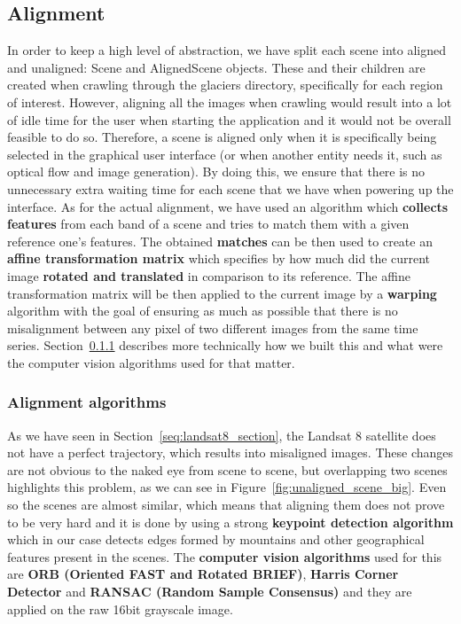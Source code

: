 \documentclass[11pt, a4paper]{report}
\begin{document}
	
	\subsection{Alignment}
	\label{seq:alignment_implementation}
	
	In order to keep a high level of abstraction, we have split each scene into aligned and unaligned: Scene and AlignedScene objects. These and their children are created when crawling through the glaciers directory, specifically for each region of interest. However, aligning all the images when crawling would result into a lot of idle time for the user when starting the application and it would not be overall feasible to do so. Therefore, a scene is aligned only when it is specifically being selected in the graphical user interface (or when another entity needs it, such as optical flow and image generation). By doing this, we ensure that there is no unnecessary extra waiting time for each scene that we have when powering up the interface.
	As for the actual alignment, we have used an algorithm which \textbf{collects features} from each band of a scene and tries to match them with a given reference one's features. The obtained \textbf{matches} can be then used to create an \textbf{affine transformation matrix} which specifies by how much did the current image \textbf{rotated and translated} in comparison to its reference. The affine transformation matrix will be then applied to the current image by a \textbf{warping} algorithm with the goal of ensuring as much as possible that there is no misalignment between any pixel of two different images from the same time series. Section~\ref{seq:alignment_algorithm} describes more technically how we built this and what were the computer vision algorithms used for that matter.
	
	\subsubsection{Alignment algorithms}
	\label{seq:alignment_algorithm}
	
	As we have seen in Section~\ref{seq:landsat8_section}, the Landsat 8 satellite does not have a perfect trajectory, which results into misaligned images. These changes are not obvious to the naked eye from scene to scene, but overlapping two scenes highlights this problem, as we can see in Figure~\ref{fig:unaligned_scene_big}. Even so the scenes are almost similar, which means that aligning them does not prove to be very hard and it is done by using a strong \textbf{keypoint detection algorithm} which in our case detects edges formed by mountains and other geographical features present in the scenes. The \textbf{computer vision algorithms} used for this are \textbf{ORB (Oriented FAST and Rotated BRIEF)}, \textbf{Harris Corner Detector} and \textbf{RANSAC (Random Sample Consensus)} and they are applied on the raw 16bit grayscale image.
	
\end{document}

